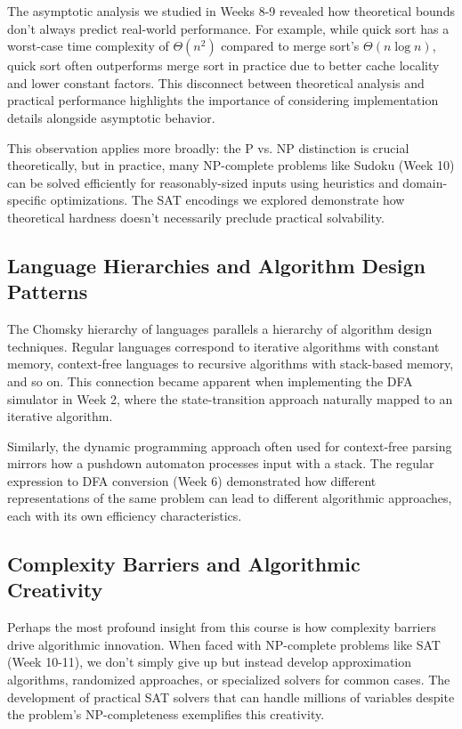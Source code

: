 \documentclass{article}
\theoremstyle{theorem}
\theoremstyle{definition}
\theoremstyle{remark}
\begin{document}
The asymptotic analysis we studied in Weeks 8-9 revealed how theoretical bounds don't always predict real-world performance. For example, while quick sort has a worst-case time complexity of $\Theta(n^2)$ compared to merge sort's $\Theta(n \log n)$, quick sort often outperforms merge sort in practice due to better cache locality and lower constant factors. This disconnect between theoretical analysis and practical performance highlights the importance of considering implementation details alongside asymptotic behavior.

This observation applies more broadly: the P vs. NP distinction is crucial theoretically, but in practice, many NP-complete problems like Sudoku (Week 10) can be solved efficiently for reasonably-sized inputs using heuristics and domain-specific optimizations. The SAT encodings we explored demonstrate how theoretical hardness doesn't necessarily preclude practical solvability.

\subsection{Language Hierarchies and Algorithm Design Patterns}

The Chomsky hierarchy of languages parallels a hierarchy of algorithm design techniques. Regular languages correspond to iterative algorithms with constant memory, context-free languages to recursive algorithms with stack-based memory, and so on. This connection became apparent when implementing the DFA simulator in Week 2, where the state-transition approach naturally mapped to an iterative algorithm.

Similarly, the dynamic programming approach often used for context-free parsing mirrors how a pushdown automaton processes input with a stack. The regular expression to DFA conversion (Week 6) demonstrated how different representations of the same problem can lead to different algorithmic approaches, each with its own efficiency characteristics.

\subsection{Complexity Barriers and Algorithmic Creativity}

Perhaps the most profound insight from this course is how complexity barriers drive algorithmic innovation. When faced with NP-complete problems like SAT (Week 10-11), we don't simply give up but instead develop approximation algorithms, randomized approaches, or specialized solvers for common cases. The development of practical SAT solvers that can handle millions of variables despite the problem's NP-completeness exemplifies this creativity.
\end{document}
